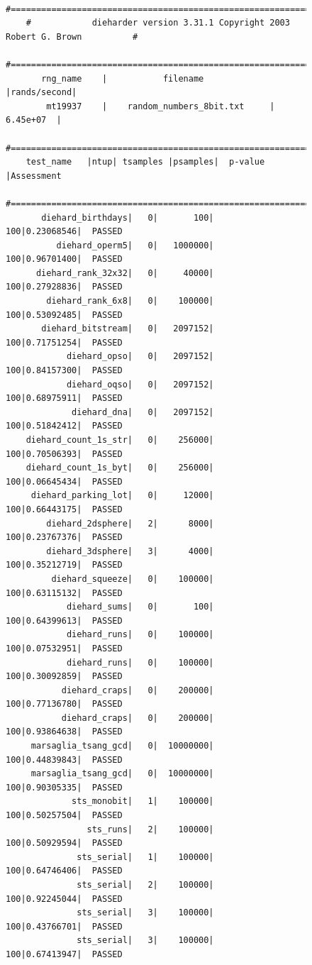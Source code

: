 \documentclass[11pt, a4paper, titlepage]{article}
\begin{document}
\begin{figure}[H]
    \fontsize{8pt}{10pt}\selectfont
    \begin{verbatim}
    #=============================================================================#
    #            dieharder version 3.31.1 Copyright 2003 Robert G. Brown          #
    #=============================================================================#
       rng_name    |           filename             |rands/second|
        mt19937    |    random_numbers_8bit.txt     |  6.45e+07  |
    #=============================================================================#
    test_name   |ntup| tsamples |psamples|  p-value |Assessment
    #=============================================================================#
       diehard_birthdays|   0|       100|     100|0.23068546|  PASSED
          diehard_operm5|   0|   1000000|     100|0.96701400|  PASSED
      diehard_rank_32x32|   0|     40000|     100|0.27928836|  PASSED
        diehard_rank_6x8|   0|    100000|     100|0.53092485|  PASSED
       diehard_bitstream|   0|   2097152|     100|0.71751254|  PASSED
            diehard_opso|   0|   2097152|     100|0.84157300|  PASSED
            diehard_oqso|   0|   2097152|     100|0.68975911|  PASSED
             diehard_dna|   0|   2097152|     100|0.51842412|  PASSED
    diehard_count_1s_str|   0|    256000|     100|0.70506393|  PASSED
    diehard_count_1s_byt|   0|    256000|     100|0.06645434|  PASSED
     diehard_parking_lot|   0|     12000|     100|0.66443175|  PASSED
        diehard_2dsphere|   2|      8000|     100|0.23767376|  PASSED
        diehard_3dsphere|   3|      4000|     100|0.35212719|  PASSED
         diehard_squeeze|   0|    100000|     100|0.63115132|  PASSED
            diehard_sums|   0|       100|     100|0.64399613|  PASSED
            diehard_runs|   0|    100000|     100|0.07532951|  PASSED
            diehard_runs|   0|    100000|     100|0.30092859|  PASSED
           diehard_craps|   0|    200000|     100|0.77136780|  PASSED
           diehard_craps|   0|    200000|     100|0.93864638|  PASSED
     marsaglia_tsang_gcd|   0|  10000000|     100|0.44839843|  PASSED
     marsaglia_tsang_gcd|   0|  10000000|     100|0.90305335|  PASSED
             sts_monobit|   1|    100000|     100|0.50257504|  PASSED
                sts_runs|   2|    100000|     100|0.50929594|  PASSED
              sts_serial|   1|    100000|     100|0.64746406|  PASSED
              sts_serial|   2|    100000|     100|0.92245044|  PASSED
              sts_serial|   3|    100000|     100|0.43766701|  PASSED
              sts_serial|   3|    100000|     100|0.67413947|  PASSED

\end{verbatim}
\end{figure}
\end{document}
